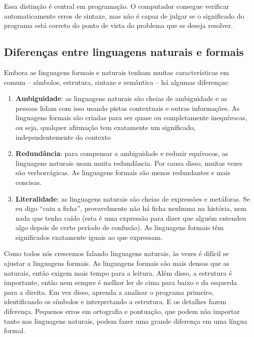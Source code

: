 \documentclass[
  brazilian,
  letterpaper,
  DIV=11,
  numbers=noendperiod]{scrreprt}
\begin{document}
Essa distinção é central em programação. O computador consegue verificar
automaticamente erros de sintaxe, mas não é capaz de julgar se o
significado do programa está correto do ponto de vista do problema que
se deseja resolver.

\subsection{Diferenças entre linguagens naturais e
formais}\label{diferenuxe7as-entre-linguagens-naturais-e-formais}

Embora as linguagens formais e naturais tenham muitas características em
comum -- símbolos, estrutura, sintaxe e semântica -- há algumas
diferenças:

\begin{enumerate}
\def\labelenumi{\arabic{enumi}.}
\item
  \textbf{Ambiguidade}: as linguagens naturais são cheias de ambiguidade
  e as pessoas lidam com isso usando pistas contextuais e outras
  informações. As linguagens formais são criadas para ser quase ou
  completamente inequívocas, ou seja, qualquer afirmação tem exatamente
  um significado, independentemente do contexto
\item
  \textbf{Redundância}: para compensar a ambiguidade e reduzir
  equívocos, as linguagens naturais usam muita redundância. Por causa
  disso, muitas vezes são verborrágicas. As linguagens formais são menos
  redundantes e mais concisas.
\item
  \textbf{Literalidade}: as linguagens naturais são cheias de expressões
  e metáforas. Se eu digo ``caiu a ficha'', provavelmente não há ficha
  nenhuma na história, nem nada que tenha caído (esta é uma expressão
  para dizer que alguém entendeu algo depois de certo período de
  confusão). As linguagens formais têm significados exatamente iguais ao
  que expressam.
\end{enumerate}

Como todos nós crescemos falando linguagens naturais, às vezes é difícil
se ajustar a linguagens formais. As linguagens formais são mais densas
que as naturais, então exigem mais tempo para a leitura. Além disso, a
estrutura é importante, então nem sempre é melhor ler de cima para baixo
e da esquerda para a direita. Em vez disso, aprenda a analisar o
programa primeiro, identificando os símbolos e interpretando a
estrutura. E os detalhes fazem diferença. Pequenos erros em ortografia e
pontuação, que podem não importar tanto nas linguagens naturais, podem
fazer uma grande diferença em uma língua formal.
\end{document}
